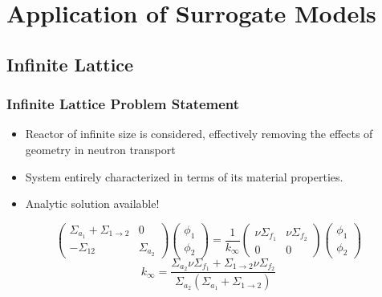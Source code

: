 \documentclass{beamer}
\begin{document}
\section{Application of Surrogate Models}

\subsection{Infinite Lattice}
\begin{frame}
\frametitle{Infinite Lattice Problem Statement}

\begin{itemize}
  \item Reactor of infinite size is considered, effectively removing the effects of geometry in neutron transport
  \item System entirely characterized in terms of its material properties.
  \item Analytic solution available!       
\end{itemize}

\begin{equation}
   \left(
    \begin{array}{cc}
     \Sigma_{a_1} + \Sigma_{1\rightarrow 2} & 0 \\
     -\Sigma_{12} & \Sigma_{a_2} 
    \end{array}
   \right)
   \left(
    \begin{array}{c}
     \phi_1 \\
     \phi_2
    \end{array}
   \right) 
   = \frac{1}{k_{\infty}}
   \left(
    \begin{array}{cc}
     \nu\Sigma_{f_1} & \nu\Sigma_{f_2} \\
     0 & 0 
    \end{array}
   \right)
   \left(
    \begin{array}{c}
     \phi_1 \\
     \phi_2
    \end{array}
   \right) \nonumber
\end{equation}
\begin{equation}
   k_{\infty} = \frac{\Sigma_{a_2}\nu\Sigma_{f_1} + 
             \Sigma_{1\rightarrow 2}\nu\Sigma_{f_2}}{
              \Sigma_{a_2}\left(
               \Sigma_{a_1} + \Sigma_{1\rightarrow 2}\right)} \nonumber
\end{equation}  

\end{frame}
\end{document}
